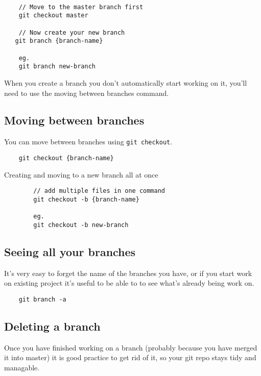 \begin{verbatim}

    // Move to the master branch first
    git checkout master

    // Now create your new branch
   git branch {branch-name}

    eg.
    git branch new-branch
\end{verbatim}

When you create a branch you don't automatically start working on it, you'll need to use the moving between branches command.
\\

\subsection{Moving between branches}

You can move between branches using \texttt{git checkout}.

\begin{verbatim}
    git checkout {branch-name}
\end{verbatim}

\begin{infobox}{Creating and moving to a new branch all at once}
    \begin{verbatim}
        // add multiple files in one command
        git checkout -b {branch-name}

        eg.
        git checkout -b new-branch
    \end{verbatim}
\end{infobox}


\subsection{Seeing all your branches}

It's very easy to forget the name of the branches you have, or if you start work on existing project it's useful to be able to to see what's already being work on.

\begin{verbatim}
    git branch -a
\end{verbatim}


\subsection{Deleting a branch}

Once you have finished working on a branch (probably because you have merged it into master) it is good practice to get rid of it, so your git repo stays tidy and managable.
\\


